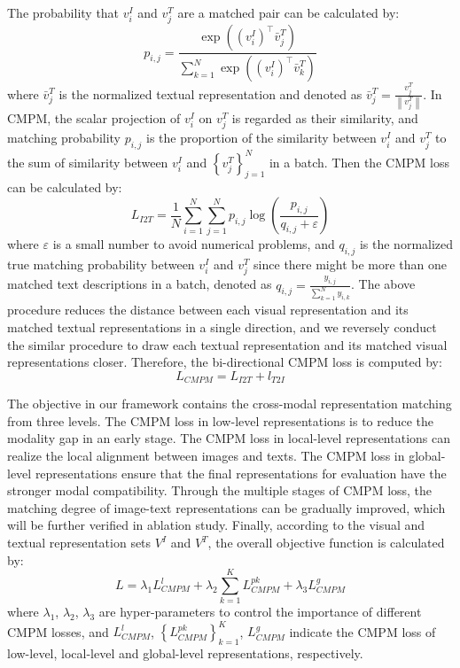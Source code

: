 \documentclass[review]{elsarticle}
\begin{document}
The probability that $v_i^I$ and $v_j^T$ are a matched pair can be calculated by:
\begin{equation}
   {p_{i,j}} = \frac{{\exp \left( {{{(v_i^I)}^ \top }\bar v_j^T} \right)}}{{\sum\limits_{k = 1}^N {\exp \left( {{{(v_i^I)}^ \top }\bar v_k^T} \right)} }}
\label{f3}
\end{equation}
where $\bar v_j^T$ is the normalized textual representation and denoted as $\bar v_j^T = \frac{{v_j^T}}{{\left\| {v_j^T} \right\|}}$. In CMPM, the scalar projection of $v_i^I$ on $v_j^T$ is regarded as their similarity, and matching probability ${p_{i,j}}$ is the proportion of the similarity between $v_i^I$ and $v_j^T$ to the sum of similarity between $v_i^I$ and $\left\{ {v_j^T} \right\}_{j = 1}^N$ in a batch. Then the CMPM loss can be calculated by:
\begin{equation}
   {L_{I2T}} = \frac{1}{N}\sum\limits_{i = 1}^N {\sum\limits_{j = 1}^N {{p_{i,j}}\log \left( {\frac{{{p_{i,j}}}}{{{q_{i,j}} + \varepsilon }}} \right)} }
\label{f4}
\end{equation}
where $\varepsilon$ is a small number to avoid numerical problems, and ${q_{i,j}}$ is the normalized true matching probability between $v_i^I$ and $v_j^T$ since there might be more than one matched text descriptions in a batch, denoted as ${q_{i,j}} = \frac{{{y_{i,j}}}}{{\sum\limits_{k = 1}^N {{y_{i,k}}} }}$. The above procedure reduces the distance between each visual representation and its matched textual representations in a single direction, and we reversely conduct the similar procedure to draw each textual representation and its matched visual representations closer. Therefore, the bi-directional CMPM loss is computed by:
\begin{equation}
   {L_{CMPM}} = {L_{I2T}} + {l_{T2I}}
\label{f5}
\end{equation}

The objective in our framework contains the cross-modal representation matching from three levels. The CMPM loss in low-level representations is to reduce the modality gap in an early stage. The CMPM loss in local-level representations can realize the local alignment between images and texts. The CMPM loss in global-level representations ensure that the final representations for evaluation have the stronger modal compatibility. Through the multiple stages of CMPM loss, the matching degree of image-text representations can be gradually improved, which will be further verified in ablation study. Finally, according to the visual and textual representation sets ${V^I}$ and ${V^T}$, the overall objective function is calculated by:
\begin{equation}
   L = {\lambda _1}L_{CMPM}^l + {\lambda _2}\sum\limits_{k = 1}^K {L_{CMPM}^{pk}}  + {\lambda _3}L_{CMPM}^g
\label{f6}
\end{equation}
where ${\lambda _1}$, ${\lambda _2}$, ${\lambda _3}$ are hyper-parameters to control the importance of different CMPM losses, and $L_{CMPM}^l$, $\left\{ {L_{CMPM}^{pk}} \right\}_{k = 1}^K$, $L_{CMPM}^g$ indicate the CMPM loss of low-level, local-level and global-level representations, respectively.
\end{document}
